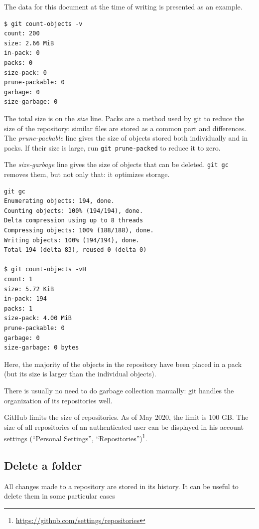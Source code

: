 \documentclass[
  12pt,
  american,
  a4paper,
  extrafontsizes,onecolumn,openright
  ]{memoir}
\begin{document}
The data for this document at the time of writing is presented as an example.

\begin{verbatim}
$ git count-objects -v
count: 200
size: 2.66 MiB
in-pack: 0
packs: 0
size-pack: 0
prune-packable: 0
garbage: 0
size-garbage: 0
\end{verbatim}

The total size is on the \emph{size} line.
Packs are a method used by git to reduce the size of the repository: similar files are stored as a common part and differences.
The \emph{prune-packable} line gives the size of objects stored both individually and in packs.
If their size is large, run \texttt{git\ prune-packed} to reduce it to zero.

The \emph{size-garbage} line gives the size of objects that can be deleted.
\texttt{git\ gc} removes them, but not only that: it optimizes storage.

\begin{verbatim}
git gc
Enumerating objects: 194, done.
Counting objects: 100% (194/194), done.
Delta compression using up to 8 threads
Compressing objects: 100% (188/188), done.
Writing objects: 100% (194/194), done.
Total 194 (delta 83), reused 0 (delta 0)

$ git count-objects -vH
count: 1
size: 5.72 KiB
in-pack: 194
packs: 1
size-pack: 4.00 MiB
prune-packable: 0
garbage: 0
size-garbage: 0 bytes
\end{verbatim}

Here, the majority of the objects in the repository have been placed in a pack (but its size is larger than the individual objects).

There is usually no need to do garbage collection manually: git handles the organization of its repositories well.

GitHub limits the size of repositories.
As of May 2020, the limit is 100 GB.
The size of all repositories of an authenticated user can be displayed in his account settings (\enquote{Personal Settings}, \enquote{Repositories})\footnote{\url{https://github.com/settings/repositories}}.

\hypertarget{delete-a-folder}{%
\subsection{Delete a folder}\label{delete-a-folder}}

All changes made to a repository are stored in its history.
It can be useful to delete them in some particular cases
\end{document}
